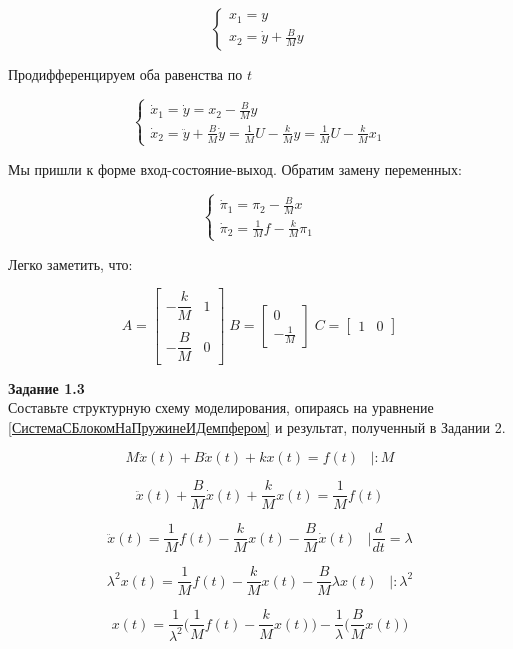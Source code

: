 \documentclass[a4paper, 12pt]{article}
\begin{document}
$$ \begin{cases}
x_1 = y \\
x_2 = \dot{y} + \frac{B}{M} y
\end{cases} $$

Продифференцируем оба равенства по $t$

$$ \begin{cases}
\dot x_1 = \dot y = x_2 - \frac{B}{M} y \\
\dot x_2 = \ddot y +\frac{B}{M} \dot y = \frac{1}{M} U - \frac{k}{M} y = \frac{1}{M} U - \frac{k}{M} x_1
\end{cases} $$

Мы пришли к форме вход-состояние-выход. Обратим замену переменных:

$$ \begin{cases}
\dot \pi_1 = \pi_2 - \frac{B}{M} x \\
\dot \pi_2 = \frac{1}{M} f - \frac{k}{M} \pi_1
\end{cases} $$

Легко заметить, что:

\[
A = \begin{bmatrix}
-\dfrac{k}{M} & 1\\ \\
-\dfrac{B}{M} & 0 
\end{bmatrix}	
\;
B = \begin{bmatrix}
0 \\
-\frac{1}{M}
\end{bmatrix}
\;
C = \begin{bmatrix}
1 & 0
\end{bmatrix}	
\]

\textbf{Задание 1.3 } \\
Составьте структурную схему моделирования, опираясь на уравнение \ref{СистемаСБлокомНаПружинеИДемпфером} и результат, полученный в Задании 2.

$$M\ddot{x}(t) + B\dot{x}(t) + kx(t) = f(t) \; \; \; |:M $$

$$\ddot{x}(t) + \frac{B}{M}\dot{x}(t) + \frac{k}{M}x(t) = \frac{1}{M} f(t) $$

$$ \ddot{x}(t) = \frac{1}{M} f(t) - \frac{k}{M}x(t) - \frac{B}{M}\dot{x}(t) \; \; \; |\frac{d}{dt} = \lambda$$

$$ \lambda^2 x(t) = \frac{1}{M} f(t) - \frac{k}{M}x(t) - \frac{B}{M} \lambda x(t) \; \; \; |:\lambda^2$$

$$ x(t) = \frac{1}{\lambda^2} \Big( \frac{1}{M} f(t) - \frac{k}{M}x(t) \Big) -\frac{1}{\lambda} \Big( \frac{B}{M} x(t) \Big) $$
\end{document}
